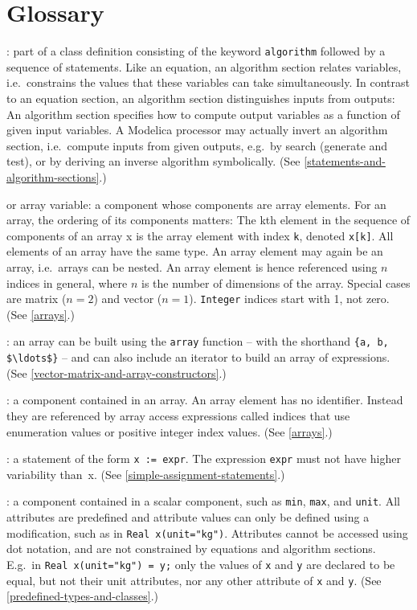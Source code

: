 \chapter{Glossary}\label{glossary}
: part of a class definition consisting of the
keyword \lstinline!algorithm! followed by a sequence of statements. Like an
equation, an algorithm section relates variables, i.e.\ constrains the
values that these variables can take simultaneously. In contrast to an
equation section, an algorithm section distinguishes inputs from
outputs: An algorithm section specifies how to compute output variables
as a function of given input variables. A Modelica processor may
actually invert an algorithm section, i.e.\ compute inputs from given
outputs, e.g.\ by search (generate and test), or by deriving an inverse
algorithm symbolically. (See \cref{statements-and-algorithm-sections}.)

 or array variable: a component whose components are array elements.  For an array, the ordering of its components matters: The kth element in the sequence of components of an array x is the array element with index \lstinline!k!, denoted \lstinline!x[k]!.  All elements of an array have the same type.  An array element may again be an array, i.e.\ arrays can be nested.  An array element is hence referenced using $n$ indices in general, where $n$ is the number of dimensions of the array.  Special cases are matrix ($n=2$) and vector ($n=1$).  \lstinline!Integer! indices start with 1, not zero.  (See \cref{arrays}.)

: an array can be built using the
\lstinline!array! function -- with the shorthand \lstinline!{a, b, $\ldots$}! -- and can also
include an iterator to build an array of expressions. (See \cref{vector-matrix-and-array-constructors}.)

: a component contained in an array. An array
element has no identifier. Instead they are referenced by array access
expressions called indices that use enumeration values or positive
integer index values. (See \cref{arrays}.)

: a statement of the form \lstinline!x := expr!. The expression
\lstinline!expr! must not have higher variability than~x. (See \cref{simple-assignment-statements}.)

: a component contained in a scalar component, such as
\lstinline!min!, \lstinline!max!, and \lstinline!unit!. All attributes are predefined and attribute values
can only be defined using a modification, such as in \lstinline!Real x(unit="kg")!.
Attributes cannot be accessed using dot notation, and are not
constrained by equations and algorithm sections. E.g.\ in \lstinline!Real x(unit="kg") = y;! only the values of \lstinline!x! and
\lstinline!y! are declared to be equal,
but not their unit attributes, nor any other attribute of \lstinline!x! and \lstinline!y!. (See
\cref{predefined-types-and-classes}.)

